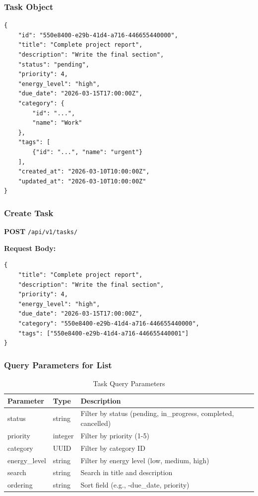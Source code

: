 \documentclass[11pt,a4paper]{article}
\begin{document}
\subsubsection{Task Object}

\begin{lstlisting}[style=json]
{
    "id": "550e8400-e29b-41d4-a716-446655440000",
    "title": "Complete project report",
    "description": "Write the final section",
    "status": "pending",
    "priority": 4,
    "energy_level": "high",
    "due_date": "2026-03-15T17:00:00Z",
    "category": {
        "id": "...",
        "name": "Work"
    },
    "tags": [
        {"id": "...", "name": "urgent"}
    ],
    "created_at": "2026-03-10T10:00:00Z",
    "updated_at": "2026-03-10T10:00:00Z"
}
\end{lstlisting}

\subsubsection{Create Task}

\textbf{POST} \texttt{/api/v1/tasks/}

\textbf{Request Body:}
\begin{lstlisting}[style=json]
{
    "title": "Complete project report",
    "description": "Write the final section",
    "priority": 4,
    "energy_level": "high",
    "due_date": "2026-03-15T17:00:00Z",
    "category": "550e8400-e29b-41d4-a716-446655440000",
    "tags": ["550e8400-e29b-41d4-a716-446655440001"]
}
\end{lstlisting}

\subsubsection{Query Parameters for List}

\begin{table}[H]
\centering
\small
\begin{tabular}{@{}llp{5cm}@{}}
\toprule
\textbf{Parameter} & \textbf{Type} & \textbf{Description} \\
\midrule
status & string & Filter by status (pending, in\_progress, completed, cancelled) \\
priority & integer & Filter by priority (1-5) \\
category & UUID & Filter by category ID \\
energy\_level & string & Filter by energy level (low, medium, high) \\
search & string & Search in title and description \\
ordering & string & Sort field (e.g., -due\_date, priority) \\
\bottomrule
\end{tabular}
\caption{Task Query Parameters}
\end{table}
\end{document}
